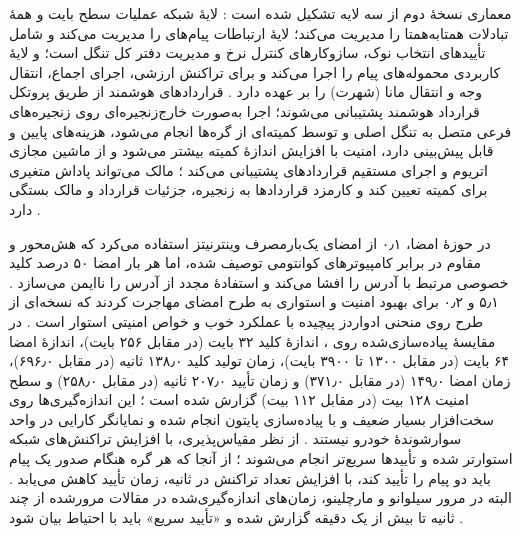 \documentclass[12pt,a4paper]{article}
\begin{document}
معماری  نسخهٔ دوم از سه لایه تشکیل شده است \cite{IOTATANGLE20, sealeyIOTATangle202022}: لایهٔ شبکه عملیات سطح بایت و همهٔ تبادلات همتا‌به‌همتا را مدیریت می‌کند؛ لایهٔ ارتباطات پیام‌های  را مدیریت می‌کند و شامل تأیید‌های انتخاب نوک، سازوکار‌های کنترل نرخ و مدیریت دفتر کل تنگل است؛ و لایهٔ کاربردی محموله‌های پیام را اجرا می‌کند و برای تراکنش ارزشی، اجرای اجماع، انتقال وجه و انتقال مانا (شهرت) را بر عهده دارد \cite{IOTATANGLE20, sealeyIOTATangle202022}. قرارداد‌های هوشمند از طریق پروتکل قرارداد هوشمند  پشتیبانی می‌شوند؛ اجرا به‌صورت خارج‌زنجیره‌ای روی زنجیره‌های فرعی متصل به تنگل اصلی و توسط کمیته‌ای از گره‌ها انجام می‌شود، هزینه‌های پایین و قابل پیش‌بینی دارد، امنیت با افزایش اندازهٔ کمیته بیشتر می‌شود و از ماشین مجازی اتریوم و اجرای مستقیم قرارداد‌های  پشتیبانی می‌کند \cite{IOTATANGLE20, sealeyIOTATangle202022}؛ مالک می‌تواند پاداش متغیری برای کمیته تعیین کند و کارمزد قرارداد‌ها به زنجیره، جزئیات قرارداد و مالک بستگی دارد \cite{IOTATANGLE20}.

در حوزهٔ امضا،  ۰٫۱ از امضای یک‌بارمصرف وینترنیتز استفاده می‌کرد که هش‌محور و مقاوم در برابر کامپیوتر‌های کوانتومی توصیف شده، اما هر بار امضا ۵۰ درصد کلید خصوصی مرتبط با آدرس را افشا می‌کند و استفادهٔ مجدد از آدرس را ناایمن می‌سازد \cite{silvanoIotaTangleCryptocurrency2020}.  ۵٫۱ و ۰٫۲ برای بهبود امنیت و استواری به طرح امضای  مهاجرت کردند \cite{IOTATANGLE20} که نسخه‌ای از طرح  روی منحنی ادواردز پیچیده با عملکرد خوب و خواص امنیتی استوار است \cite{IOTATANGLE20}. در مقایسهٔ پیاده‌سازی‌شده روی  ، اندازهٔ کلید ۳۲ بایت (در مقابل ۲۵۶ بایت)، اندازهٔ امضا ۶۴ بایت (در مقابل ۱۳۰۰ تا ۳۹۰۰ بایت)، زمان تولید کلید ۱۳۸٫۰ ثانیه (در مقابل ۶۹۶٫۰)، زمان امضا ۱۴۹٫۰ (در مقابل ۳۷۱٫۰) و زمان تأیید ۲۰۷٫۰ ثانیه (در مقابل ۲۵۸٫۰) و سطح امنیت ۱۲۸ بیت (در مقابل ۱۱۲ بیت) گزارش شده است \cite{IOTATANGLE20}؛ این اندازه‌گیری‌ها روی سخت‌افزار بسیار ضعیف و با پیاده‌سازی پایتون انجام شده و نمایانگر کارایی در واحد سوارشوندهٔ خودرو نیستند \cite{IOTATANGLE20}. از نظر مقیاس‌پذیری، با افزایش تراکنش‌های  شبکه استوارتر شده و تأیید‌ها سریع‌تر انجام می‌شوند \cite{IOTATANGLE20}؛ از آنجا که هر گره هنگام صدور یک پیام باید دو پیام را تأیید کند، با افزایش تعداد تراکنش در ثانیه، زمان تأیید کاهش می‌یابد \cite{sealeyIOTATangle202022}. البته در مرور سیلوانو و مارچلینو، زمان‌های اندازه‌گیری‌شده در مقالات مرورشده از چند ثانیه تا بیش از یک دقیقه گزارش شده و «تأیید سریع» باید با احتیاط بیان شود \cite{silvanoIotaTangleCryptocurrency2020}.
\end{document}
